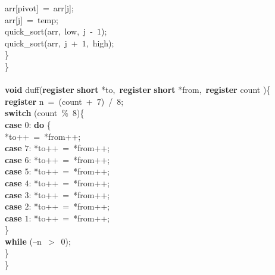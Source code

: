 \begin{tabbing}
arr[pivot]\ =\ arr[j];\\
arr[j]\ =\ temp;\\
quick\_sort(arr,\ low,\ j\ -\ $1$);\\
quick\_sort(arr,\ j\ +\ $1$,\ high);\\
\<\}\-\\
\<\}\-\\
\\
{\bf void}  duff({\bf register} {\bf short}  *to,\ {\bf register} {\bf short}  *from,\ {\bf register} count )\{\+\\
{\bf register}  n\ =\ (count\ +\ $7$)\ /\ $8$;\\
{\bf switch} (count\ \%\ $8$)\{\+\\
{\bf case} $0$: {\bf do} \{\+\\
 *to++\ =\ *from++;\\
{\bf case} $7$: *to++\ =\ *from++;\\
{\bf case} $6$: *to++\ =\ *from++;\\
{\bf case} $5$: *to++\ =\ *from++;\\
{\bf case} $4$: *to++\ =\ *from++;\\
{\bf case} $3$: *to++\ =\ *from++;\\
{\bf case} $2$: *to++\ =\ *from++;\\
{\bf case} $1$: *to++\ =\ *from++;\\
\<\}\-\\
{\bf while} (--n\ $>$\ $0$);\\
\<\}\-\\
\<\}\-\\
\\
\end{tabbing}